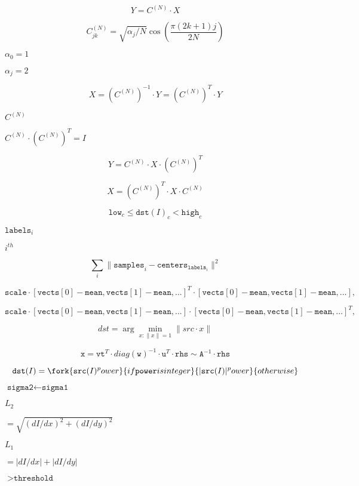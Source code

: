 \documentclass{article}
\begin{document}
\[Y = C^{(N)} \cdot X\]
\pagebreak

\[C^{(N)}_{jk}= \sqrt{\alpha_j/N} \cos \left ( \frac{\pi(2k+1)j}{2N} \right )\]
\pagebreak

$\alpha_0=1$
\pagebreak

$\alpha_j=2$
\pagebreak

\[X = \left (C^{(N)} \right )^{-1} \cdot Y = \left (C^{(N)} \right )^T \cdot Y\]
\pagebreak

$C^{(N)}$
\pagebreak

$C^{(N)} \cdot \left(C^{(N)}\right)^T = I$
\pagebreak

\[Y = C^{(N)} \cdot X \cdot \left (C^{(N)} \right )^T\]
\pagebreak

\[X = \left (C^{(N)} \right )^T \cdot X \cdot C^{(N)}\]
\pagebreak

\[\texttt{low} _c \leq \texttt{dst} (I)_c < \texttt{high} _c\]
\pagebreak

$\texttt{labels}_i$
\pagebreak

$i^{th}$
\pagebreak

\[\sum _i \| \texttt{samples} _i - \texttt{centers} _{ \texttt{labels} _i} \| ^2\]
\pagebreak

\[\texttt{scale} \cdot [ \texttt{vects} [0]- \texttt{mean} , \texttt{vects} [1]- \texttt{mean} ,...]^T \cdot [ \texttt{vects} [0]- \texttt{mean} , \texttt{vects} [1]- \texttt{mean} ,...],\]
\pagebreak

\[\texttt{scale} \cdot [ \texttt{vects} [0]- \texttt{mean} , \texttt{vects} [1]- \texttt{mean} ,...] \cdot [ \texttt{vects} [0]- \texttt{mean} , \texttt{vects} [1]- \texttt{mean} ,...]^T,\]
\pagebreak

\[dst = \arg \min _{x: \| x \| =1} \| src \cdot x \|\]
\pagebreak

\[\texttt{x} = \texttt{vt} ^T \cdot diag( \texttt{w} )^{-1} \cdot \texttt{u} ^T \cdot \texttt{rhs} \sim \texttt{A} ^{-1} \cdot \texttt{rhs}\]
\pagebreak

\[\texttt{dst} (I) = \fork{\texttt{src}(I)^power}{if \texttt{power} is integer}{|\texttt{src}(I)|^power}{otherwise}\]
\pagebreak

$\texttt{sigma2}\leftarrow\texttt{sigma1}$
\pagebreak

$L_2$
\pagebreak

$=\sqrt{(dI/dx)^2 + (dI/dy)^2}$
\pagebreak

$L_1$
\pagebreak

$=|dI/dx|+|dI/dy|$
\pagebreak

$>\texttt{threshold}$
\pagebreak
\end{document}
